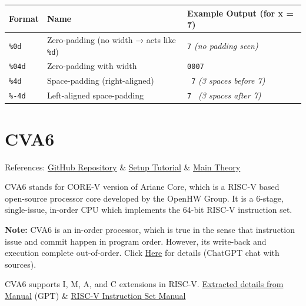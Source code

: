 \documentclass[12pt, a4paper]{article}
\begin{document}
\begin{center}
\begin{tabular}{|l|l|p{}|}
\hline
\textbf{Format} & \textbf{Name} & \textbf{Example Output (for x = 7)} \\
\hline
\texttt{\%0d} & Zero-padding (no width → acts like \texttt{\%d}) & \texttt{7} \textit{(no padding seen)} \\
\hline
\texttt{\%04d} & Zero-padding with width & \texttt{0007} \\
\hline
\texttt{\%4d} & Space-padding (right-aligned) & \texttt{   7} \textit{(3 spaces before 7)} \\
\hline
\texttt{\%-4d} & Left-aligned space-padding & \texttt{7   } \textit{(3 spaces after 7)} \\
\hline
\end{tabular}
\end{center}


\section{CVA6}

References: \href{https://github.com/openhwgroup/cva6}{GitHub Repository} \&
\href{https://github.com/VedantPahariya/cva6/blob/master/tutorials/running_sim.md}{Setup Tutorial} \& \href{https://cva6.readthedocs.io/en/latest/03_cva6_design/intro.html}{Main Theory}

\vspace{0.5em}

CVA6 stands for CORE-V version of Ariane Core, which is a RISC-V based open-source processor core developed by the OpenHW Group. It is a 6-stage, single-issue, in-order CPU which implements the 64-bit RISC-V instruction set.

\vspace{0.5em}

\textbf{Note:} CVA6 is an in-order processor, which is true in the sense that instruction issue and commit happen in program order. However, its write-back and execution complete out-of-order. Click \href{https://chatgpt.com/s/t_6859b47774988191b23e0e92336e7668}{Here} for details (ChatGPT chat with sources).

\vspace{0.5em}

CVA6 supports I, M, A, and C extensions in RISC-V. \href{https://chatgpt.com/s/t_6859b7c99a1481919e4f0061d34eb39e}{Extracted details from Manual} (GPT) \& \href{https://www2.eecs.berkeley.edu/Pubs/TechRpts/2016/EECS-2016-118.pdf}{RISC-V Instruction Set Manual}
\end{document}
